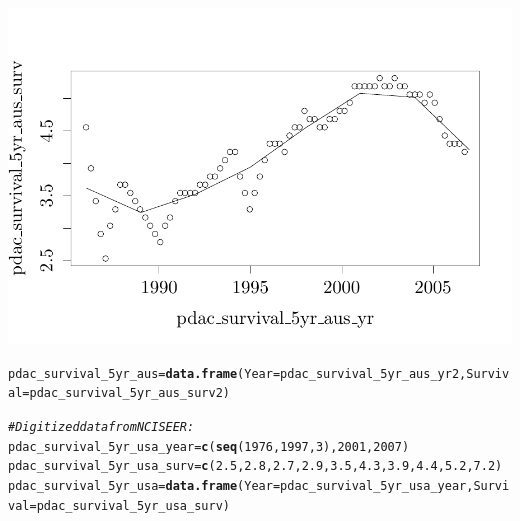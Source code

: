 \documentclass{article}\usepackage[]{graphicx}\usepackage[]{color}
\makeatletter
\def\maxwidth{ %
  \ifdim\Gin@nat@width>\linewidth
    \linewidth
  \else
    \Gin@nat@width
  \fi
}
\newcommand{\hlnum}[1]{\textcolor[rgb]{0.686,0.059,0.569}{#1}}%
\newcommand{\hlcom}[1]{\textcolor[rgb]{0.678,0.584,0.686}{\textit{#1}}}%
\newcommand{\hlstd}[1]{\textcolor[rgb]{0.345,0.345,0.345}{#1}}%
\newcommand{\hlkwb}[1]{\textcolor[rgb]{0.69,0.353,0.396}{#1}}%
\newcommand{\hlkwc}[1]{\textcolor[rgb]{0.333,0.667,0.333}{#1}}%
\newcommand{\hlkwd}[1]{\textcolor[rgb]{0.737,0.353,0.396}{\textbf{#1}}}%
\newenvironment{kframe}{%
 \def\at@end@of@kframe{}%
 \ifinner\ifhmode%
  \def\at@end@of@kframe{\end{minipage}}%
  \begin{minipage}{\columnwidth}%
 \fi\fi%
 \def\FrameCommand##1{\hskip\@totalleftmargin \hskip-\fboxsep
 \colorbox{shadecolor}{##1}\hskip-\fboxsep
     \hskip-\linewidth \hskip-\@totalleftmargin \hskip\columnwidth}%
 \MakeFramed {\advance\hsize-\width
   \@totalleftmargin\z@ \linewidth\hsize
   \@setminipage}}%
 {\par\unskip\endMakeFramed%
 \at@end@of@kframe}
\newenvironment{knitrout}{}{} %
\makeatother
\begin{document}
\begin{knitrout}
{\centering \includegraphics[width=\maxwidth]{figure/historical-survival-pdac-1} 

}


\begin{kframe}\begin{alltt}
\hlstd{pdac_survival_5yr_aus} \hlkwb{=} \hlkwd{data.frame}\hlstd{(}\hlkwc{Year} \hlstd{= pdac_survival_5yr_aus_yr2,} \hlkwc{Survival} \hlstd{= pdac_survival_5yr_aus_surv2)}

\hlcom{# Digitized data from NCI SEER:}
\hlstd{pdac_survival_5yr_usa_year} \hlkwb{=} \hlkwd{c}\hlstd{(}\hlkwd{seq}\hlstd{(}\hlnum{1976}\hlstd{,} \hlnum{1997}\hlstd{,} \hlnum{3}\hlstd{),} \hlnum{2001}\hlstd{,} \hlnum{2007}\hlstd{)}
\hlstd{pdac_survival_5yr_usa_surv} \hlkwb{=} \hlkwd{c}\hlstd{(}\hlnum{2.5}\hlstd{,} \hlnum{2.8}\hlstd{,} \hlnum{2.7}\hlstd{,} \hlnum{2.9}\hlstd{,} \hlnum{3.5}\hlstd{,} \hlnum{4.3}\hlstd{,} \hlnum{3.9}\hlstd{,} \hlnum{4.4}\hlstd{,} \hlnum{5.2}\hlstd{,} \hlnum{7.2}\hlstd{)}
\hlstd{pdac_survival_5yr_usa} \hlkwb{=} \hlkwd{data.frame}\hlstd{(}\hlkwc{Year} \hlstd{= pdac_survival_5yr_usa_year,} \hlkwc{Survival} \hlstd{= pdac_survival_5yr_usa_surv)}


\end{alltt}
\end{kframe}
\end{knitrout}
\end{document}
